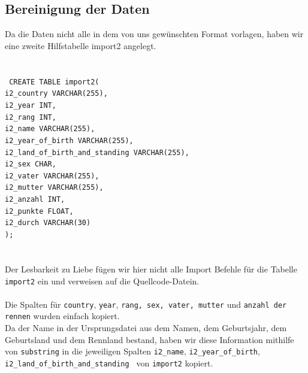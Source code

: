 \documentclass[10pt,a4paper]{article}
\begin{document}
 	\subsection{Bereinigung der Daten}
 Da die Daten nicht alle in dem von uns gewünschten Format vorlagen, haben wir eine zweite Hilfstabelle import2 angelegt. \\ \\
 \\
 \texttt{
 	CREATE TABLE import2(\\
 	\hspace*{4mm}	i2\_country VARCHAR(255),\\
 	\hspace*{4mm}	i2\_year INT,\\
 	\hspace*{4mm}	i2\_rang INT,\\
 	\hspace*{4mm}	i2\_name VARCHAR(255),\\
 	\hspace*{4mm}	i2\_year\_of\_birth VARCHAR(255),\\
 	\hspace*{4mm}	i2\_land\_of\_birth\_and\_standing VARCHAR(255),\\
 	\hspace*{4mm}	i2\_sex CHAR,\\
 	\hspace*{4mm}	i2\_vater VARCHAR(255),\\
 	\hspace*{4mm}	i2\_mutter VARCHAR(255),\\
 	\hspace*{4mm}	i2\_anzahl INT,\\
 	\hspace*{4mm}	i2\_punkte FLOAT,\\
 	\hspace*{4mm}	i2\_durch VARCHAR(30)\\
 	);\\
 	\\}
  \\
  Der Lesbarkeit zu Liebe fügen wir hier nicht alle Import Befehle für die Tabelle \texttt{import2} ein und verweisen auf die Quellcode-Datein.\\ \\
  Die Spalten für \texttt{country}, \texttt{year}, \texttt{rang, sex, vater, mutter} und \texttt{anzahl der rennen} wurden einfach kopiert. \\
  Da der Name in der Ursprungsdatei aus dem Namen, dem Geburtsjahr, dem Geburtsland und dem Rennland bestand, haben wir diese Information mithilfe von \texttt{substring} in die jeweiligen Spalten \texttt{i2\_name}, \texttt{i2\_year\_of\_birth}, \\ \texttt{i2\_land\_of\_birth\_and\_standing } von \texttt{import2} kopiert.\\ \\
\end{document}
